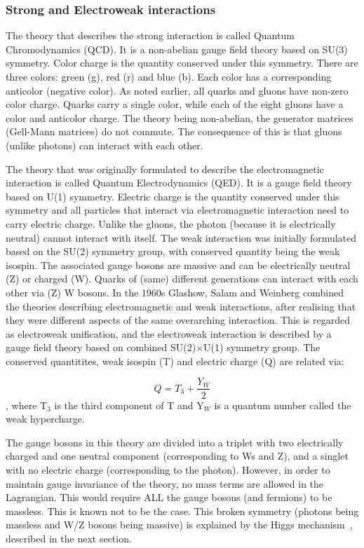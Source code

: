 \subsubsection{Strong and Electroweak interactions}
The theory that describes the strong interaction is called Quantum Chromodynamics (QCD). It is a non-abelian gauge field theory based on  SU(3) symmetry. Color charge is the quantity conserved under this symmetry. There are three colors: green (g), red (r) and blue (b). Each color has a corresponding anticolor (negative color). As noted earlier, all quarks and gluons have non-zero color charge. Quarks carry a single color, while each of the eight gluons have a color and anticolor charge. The theory being non-abelian, the generator matrices (Gell-Mann matrices) do not commute. The consequence of this is that gluons (unlike photons) can interact with each other.

The theory that was originally formulated to describe the electromagnetic interaction is called Quantum Electrodynamics (QED). It is a gauge field theory based on U(1) symmetry. Electric charge is the quantity conserved under this symmetry and all particles that interact via electromagnetic interaction need to carry electric charge. Unlike the gluons, the photon (because it is electrically neutral) cannot interact with itself. The weak interaction was initially formulated based on the SU(2) symmetry group, with conserved quantity being the weak isospin. The associated gauge bosons are massive and can be electrically neutral (Z) or charged (W). Quarks of (same) different generations can interact with each other via (Z) W bosons. In the 1960s Glashow, Salam and Weinberg combined the theories describing electromagnetic and weak interactions, after realising that they were different aspects of the same overarching interaction. This is regarded as electroweak unification, and the electroweak interaction is described by a gauge field theory based on combined SU(2)$\times$U(1) symmetry group. The conserved quantitites, weak isospin (T) and electric charge (Q) are related via:

\begin{equation*}
  Q = T_{3} + \frac{Y_{W}}{2}
\end{equation*}
, where $\mathrm{T}_{3}$ is the third component of T and $\mathrm{Y}_{W}$ is a quantum number called the weak hypercharge.

The gauge bosons in this theory are divided into a triplet with two electrically charged and one neutral component (corresponding to Ws and Z), and a singlet with no electric charge (corresponding to the photon). However, in order to maintain gauge invariance of the theory, no mass terms are allowed in the Lagrangian. This would require ALL the gauge bosons (and fermions) to be massless. This is known not to be the case. This broken symmetry (photons being massless and W/Z bosons being massive) is explained by the Higgs mechanism~\cite{Englert:1964et,Higgs:1964ia,Higgs:1964pj,Guralnik:1964eu}, described in the next section.

